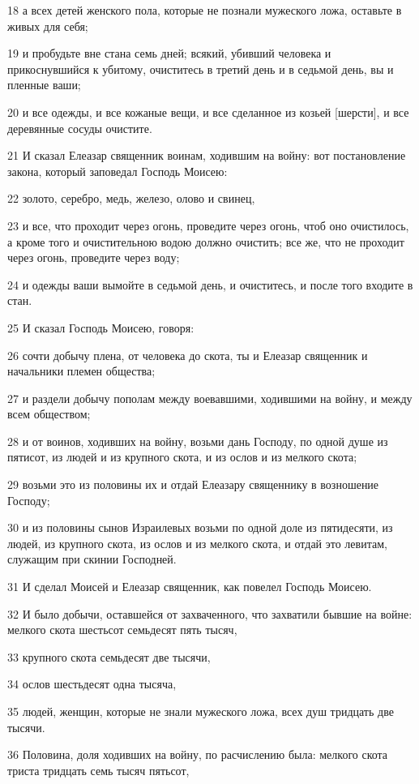 \par 18 а всех детей женского пола, которые не познали мужеского ложа, оставьте в живых для себя;
\par 19 и пробудьте вне стана семь дней; всякий, убивший человека и прикоснувшийся к убитому, очиститесь в третий день и в седьмой день, вы и пленные ваши;
\par 20 и все одежды, и все кожаные вещи, и все сделанное из козьей [шерсти], и все деревянные сосуды очистите.
\par 21 И сказал Елеазар священник воинам, ходившим на войну: вот постановление закона, который заповедал Господь Моисею:
\par 22 золото, серебро, медь, железо, олово и свинец,
\par 23 и все, что проходит через огонь, проведите через огонь, чтоб оно очистилось, а кроме того и очистительною водою должно очистить; все же, что не проходит через огонь, проведите через воду;
\par 24 и одежды ваши вымойте в седьмой день, и очиститесь, и после того входите в стан.
\par 25 И сказал Господь Моисею, говоря:
\par 26 сочти добычу плена, от человека до скота, ты и Елеазар священник и начальники племен общества;
\par 27 и раздели добычу пополам между воевавшими, ходившими на войну, и между всем обществом;
\par 28 и от воинов, ходивших на войну, возьми дань Господу, по одной душе из пятисот, из людей и из крупного скота, и из ослов и из мелкого скота;
\par 29 возьми это из половины их и отдай Елеазару священнику в возношение Господу;
\par 30 и из половины сынов Израилевых возьми по одной доле из пятидесяти, из людей, из крупного скота, из ослов и из мелкого скота, и отдай это левитам, служащим при скинии Господней.
\par 31 И сделал Моисей и Елеазар священник, как повелел Господь Моисею.
\par 32 И было добычи, оставшейся от захваченного, что захватили бывшие на войне: мелкого скота шестьсот семьдесят пять тысяч,
\par 33 крупного скота семьдесят две тысячи,
\par 34 ослов шестьдесят одна тысяча,
\par 35 людей, женщин, которые не знали мужеского ложа, всех душ тридцать две тысячи.
\par 36 Половина, доля ходивших на войну, по расчислению была: мелкого скота триста тридцать семь тысяч пятьсот,

